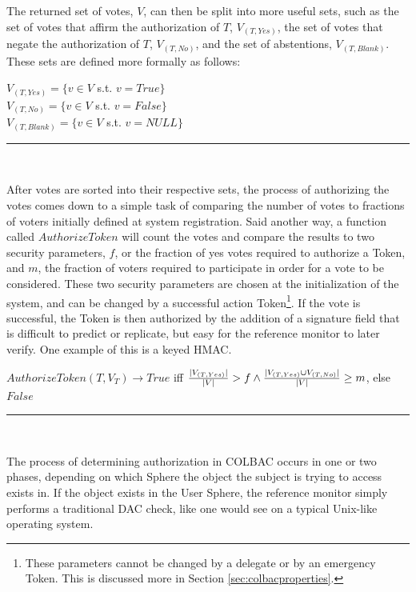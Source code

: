 \noindent The returned set of votes, $V$, can then be split into more useful
sets, such as the set of votes that affirm the authorization of $T$,
$V_{(T, Yes)}$, the set of votes that negate the authorization of $T$,
$V_{(T, No)}$, and the set of abstentions, $V_{(T, Blank)}$. These sets are
defined more formally as follows:

\begin{definition}\label{def:votes}
$V_{(T, Yes)} = \{v \in V$ s.t. $v = True\}$\\
$V_{(T, No)} = \{v \in V$ s.t. $v = False\}$\\
$V_{(T, Blank)} = \{v \in V$ s.t. $v = NULL\}$\\
\hrule\mbox{}\\
\end{definition}

\noindent After votes are sorted into their respective sets, the process of
authorizing the votes comes down to a simple task of comparing the number of
votes to fractions of voters initially defined at system registration. Said
another way, a function called $AuthorizeToken$ will count the votes and compare
the results to two security parameters, $f$, or the fraction of yes votes
required to authorize a Token, and $m$, the fraction of voters required to
participate in order for a vote to be considered. These two security parameters
are chosen at the initialization of the system, and can be changed by a
successful action Token\footnote{These parameters cannot be changed by a
delegate or by an emergency Token. This is discussed more in Section
\ref{sec:colbacproperties}.}. If the vote is successful, the Token is then
authorized by the addition of a signature field that is difficult to predict or
replicate, but easy for the reference monitor to later verify. One example of
this is a keyed HMAC.
\begin{definition}
$AuthorizeToken(T,V_{T}) \rightarrow True$ iff $\frac{|V_{(T, Yes)}|}{|V|} > f
\wedge \\ \frac{|V_{(T,Yes)} \cup V_{(T, No)}|}{|V|} \ge m$, else $False$\\
\hrule\mbox{}\\
\end{definition}

The process of determining authorization in COLBAC occurs in one or two phases,
depending on which Sphere the object the subject is trying to access exists in.
If the object exists in the User Sphere, the reference monitor simply performs a
traditional DAC check, like one would see on a typical Unix-like operating
system.

